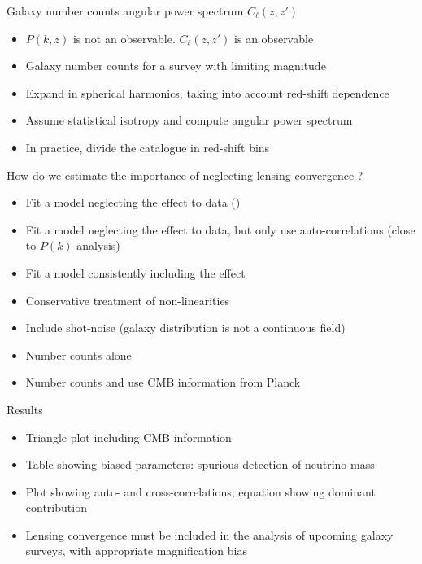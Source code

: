 \documentclass{beamer}
\begin{document}
\begin{frame}{Galaxy number counts angular power spectrum $C_\ell(z,z')$}
\begin{itemize}
\item $P(k,z)$ is not an observable. $C_\ell(z,z')$ is an observable
\item Galaxy number counts for a survey with limiting magnitude
\item Expand in spherical harmonics, taking into account red-shift dependence
\item Assume statistical isotropy and compute angular power spectrum 
\item In practice, divide the catalogue in red-shift bins 
\end{itemize}
\end{frame}

\begin{frame}{How do we estimate the importance of neglecting lensing convergence ?}
\begin{itemize}
\item Fit a model neglecting the effect to data ()
\item Fit a model neglecting the effect to data, but only use auto-correlations (close to $P(k)$ analysis)
\item Fit a model consistently including the effect 
\item Conservative treatment of non-linearities
\item Include shot-noise (galaxy distribution is not a continuous field)
\item Number counts alone 
\item Number counts and use CMB information from Planck
\end{itemize}
\end{frame}

\begin{frame}{Results}
\begin{itemize}
\item Triangle plot including CMB information
\item Table showing biased parameters: spurious detection of neutrino mass
\item Plot showing auto- and cross-correlations, equation showing dominant contribution
\item Lensing convergence must be included in the analysis of upcoming galaxy surveys, with appropriate magnification bias
\end{itemize}
\end{frame}
\end{document}
